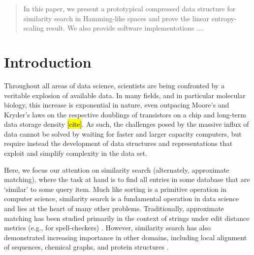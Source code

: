 \documentclass[review,preprint,12pt]{elsarticle}
\theoremstyle{definition}
\theoremstyle{remark}
\numberwithin{equation}{section}
\begin{document}
\begin{frontmatter}
\begin{abstract}
In this paper, we present a prototypical compressed data structure for
similarity search in Hamming-like spaces and prove the linear entropy-scaling
result.
We also provide software implementations ....


\end{abstract}


\end{frontmatter}


\section{Introduction}
Throughout all areas of data science, scientists are being confronted by a veritable explosion of available data.
In many fields, and in particular molecular biology, this increase is exponential in nature, even outpacing Moore's and Kryder's laws on the respective doublings of transistors on a chip and long-term data storage density \hl{[cite]}.
As such, the challenges posed by the massive influx of data cannot be solved by waiting for faster and larger capacity computers, but require instead the development of data structures and representations that exploit and simplify complexity in the data set.

Here, we focus our attention on similarity search (alternately, approximate matching), where the task at hand is to find all entries in some database that are `similar' to some query item.
Much like sorting is a primitive operation in computer science, similarity search is a fundamental operation in data science and lies at the heart of many other problems.
Traditionally, approximate matching has been studied primarily in the context of strings under edit distance metrics (e.g., for spell-checkers) \cite{ukkonen1985algorithms}.
However, similarity search has also demonstrated increasing importance in other domains, including local alignment of sequences, chemical graphs, and protein structures \cite{altschul1990basic, kent2002blat, schaeffer2007graph, budowski2010fragbag}.
\end{document}
